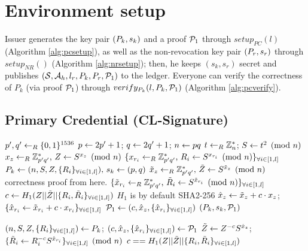 \documentclass{article}
\begin{document}
\section{Environment setup}
Issuer generates the key pair $(P_{k}, s_{k})$ and a proof $\mathcal{P}_{1}$ through $setup_{PC}(l)$ (Algorithm \ref{alg:pcsetup}), as well as the non-revocation key pair $(P_{r}, s_{r})$ through $setup_{NR}()$ (Algorithm \ref{alg:nrsetup}); then, he keeps $(s_{k}, s_{r})$ secret and publishes $(\mathcal{S}, \mathcal{A}_{h} , l_{r}, P_{k}, P_{r}, \mathcal{P}_{1})$ to the ledger. Everyone can verify the correctness of $P_{k}$ (via proof $\mathcal{P}_{1}$) through $verify_{P_{k}}(l, P_{k}, \mc{P}_{1})$ (Algorithm \ref{alg:pcverify}).

\subsection{Primary Credential (CL-Signature)}

\begin{algorithm}
\caption{$setup_{PC}(l)$}
\label{alg:pcsetup}
\begin{algorithmic}
	\State $p',q'\leftarrow _{R} \{0, 1\}^{1536}$
	\State $p\leftarrow 2p'+1$; $q\leftarrow 2q'+1$; $n\leftarrow pq$
	\State $t\leftarrow _{R} \mathbb{Z}_{n}^{*}$; $S\leftarrow t^2\pmod{n}$
	\State $x_{z}\leftarrow _{R} \mathbb{Z}_{p'q'}^{*}\mbox{, }Z\leftarrow S^{x_{z}}\pmod{n}$
	\State $\{x_{r_i}\leftarrow _{R} \mathbb{Z}_{p'q'}^{*}\mbox{, }R_{i}\leftarrow S^{x_{r_i}}\pmod{n}\}_{\forall i\in [1,l]}$
	\State $P_{k}\leftarrow {(n, S, Z, \{R_i\}_{\forall i\in [1,l]})}\mbox{, }s_{k}\leftarrow {(p,q)}$
	\State $\tilde{x}_{z}\leftarrow _{R} \mathbb{Z}_{p'q'}^{*}\mbox{, }\tilde{Z}\leftarrow S^{\tilde{x}_{z}}\pmod{n}$
	\Comment correctness proof from here.
	\State $\{\tilde{x}_{r_i}\leftarrow _{R} \mathbb{Z}_{p'q'}^{*}\mbox{, }\tilde{R}_{i}\leftarrow S^{\tilde{x}_{r_i}}\pmod{n}\}_{\forall i\in [1,l]}$
	\State $c\leftarrow H_{1}(Z||\tilde{Z}||\{R_i,\tilde{R}_i\}_{\forall i\in [1,l]})$
	\Comment $H_1$ is by default SHA2-256
	\State $\hat{x}_{z}\leftarrow \tilde{x}_{z} + c\cdot x_{z}$; $\{\hat{x}_{r_{i}}\leftarrow \tilde{x}_{r_{i}} + c\cdot x_{r_{i}}\}_{\forall i\in [1,l]}$
	\State $\mathcal{P}_{1}\leftarrow (c, \hat{x}_{z}, \{ \hat{x}_{r_{i}}\}_{\forall i\in [1,l]})$
	\State \Return $(P_{k}, s_{k}, \mathcal{P}_{1})$
\end{algorithmic}
\end{algorithm}

\begin{algorithm}
\caption{$verify_{P_{k}}(l, P_{k}, \mc{P}_{1})$}
\label{alg:pcverify}
\begin{algorithmic}
	\State $(n, S, Z, \{R_i\}_{\forall i\in [1,l]}) \leftarrow P_{k}$; $(c, \hat{x}_{z}, \{ \hat{x}_{r_{i}}\}_{\forall i\in [1,l]}) \leftarrow \mathcal{P}_{1}$
	\State $\tilde{Z}_{}\leftarrow Z_{}^{-c}S^{\hat{x}{_{z}}}$; $\{\tilde{R}_{i}\leftarrow R_{i}^{-c}S^{\hat{x}{_{r_{i}}}}\}_{\forall i\in [1,l]}\pmod{n}$
	\State \Return $c==H_{1}(Z||\tilde{Z}||\{R_i,\tilde{R}_i\}_{\forall i\in [1,l]})$
\end{algorithmic}
\end{algorithm}
\end{document}
